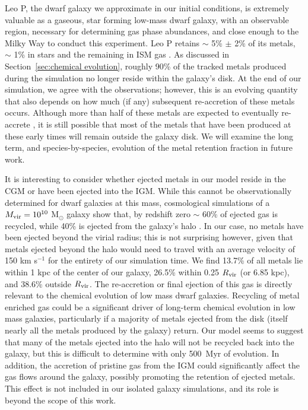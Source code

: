 \documentclass[twocolumn]{aastex61}
\begin{document}
Leo P, the dwarf galaxy we approximate in our initial conditions, is extremely valuable as a gaseous, star forming low-mass dwarf galaxy, with an observable  region, necessary for determining gas phase abundances, and close enough to the Milky Way to conduct this experiment. Leo P retains $\sim$ 5\% $\pm$ 2\% of its metals, $\sim$ 1\% in stars and the remaining in ISM gas \citep{McQuinn2015}. As discussed in Section~\ref{sec:chemical evolution}, roughly 90\% of the tracked metals produced during the simulation no longer reside within the galaxy's disk. At the end of our simulation, we agree with the observations; however, this is an evolving quantity that also depends on how much (if any) subsequent re-accretion of these metals occurs. Although more than half of these metals are expected to eventually re-accrete \citep{Angles-Alcazar2017}, it is still possible that
most of the metals that have been produced at these early times will remain outside the galaxy disk. We will examine the long term, and species-by-species, evolution of the metal retention fraction in future work.

It is interesting to consider whether ejected metals in our model reside in the CGM or have been ejected into the IGM. While this cannot be observationally determined for dwarf galaxies at this mass, cosmological simulations of a $M_{\rm vir} = 10^{10}$ M$_{\odot}$ galaxy show that, by redshift zero $\sim$ 60\% of ejected gas is recycled, while 40\% is ejected from the galaxy's halo \citep{Angles-Alcazar2017}. In our case, no metals have been ejected beyond the virial radius; this is not surprising however, given that metals ejected beyond the halo would need to travel with an average velocity of 150 km s$^{-1}$ for the entirety of our simulation time.  We find 13.7\% of all metals lie within 1 kpc of the center of our galaxy, 26.5\% within 0.25 $R_{\rm vir}$ (or 6.85 kpc), and 38.6\% outside $R_{\rm vir}$. The re-accretion or final ejection of this gas is directly relevant to the chemical evolution of low mass dwarf galaxies. Recycling of metal enriched gas could be a significant driver of long-term chemical evolution in low mass galaxies, particularly if a majority of metals ejected from the disk (itself nearly all the metals produced by the galaxy) return. Our model seems to suggest that many of the metals ejected into the halo will not be recycled back into the galaxy, but this is difficult to determine with only 500~Myr of evolution. In addition, the accretion of pristine gas from the IGM could significantly affect the gas flows around the galaxy, possibly promoting the retention of ejected metals. This effect is not included in our isolated galaxy simulations, and its role is beyond the scope of this work.
\end{document}
